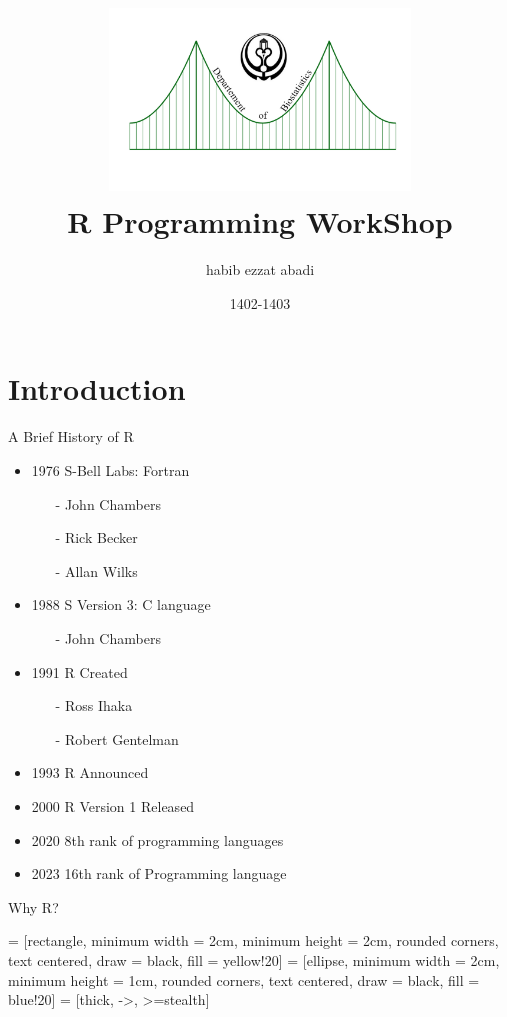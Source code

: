 \documentclass{beamer}\usepackage[]{graphicx}\usepackage[]{xcolor}
\date{\small 1402-1403\\[0.5cm]}
\title[R WorkShop]{\includegraphics[height = 5cm, width = 8cm]{Logo_Sums_BioStatistics.png}\\  R Programming WorkShop}
\author{habib ezzat abadi}
\institute{Shiraz University of Medical Scinece}
\begin{document}
\frame[plain]{\maketitle}
\section{Introduction}
\begin{frame}{A Brief History of R}
 \begin{itemize}
\item 1976 S-Bell Labs: Fortran 
\begin{itemize}
\item[-]John Chambers
\item[-] Rick Becker
\item[-] Allan Wilks 
\end{itemize}
\item 1988 S Version 3: C language 
\begin{itemize}
    \item[-] John Chambers 
\end{itemize}
\item 1991 R Created 
\begin{itemize}
    \item[-] Ross Ihaka
    \item[-] Robert Gentelman 
\end{itemize}
\item 1993 R Announced
\item 2000 R Version 1 Released
\item 2020 8th rank of programming languages
\item 2023 16th rank of Programming language
 \end{itemize}   
\end{frame}
\begin{frame}{Why R?}

     = [rectangle, minimum width = 2cm, minimum height = 2cm, 
    rounded corners, text centered, draw = black, fill = yellow!20]
     = [ellipse, minimum width = 2cm, minimum height = 1cm, 
    rounded corners, text centered, draw = black, fill = blue!20]
     = [thick, ->, >=stealth]




\end{frame}
\end{document}
